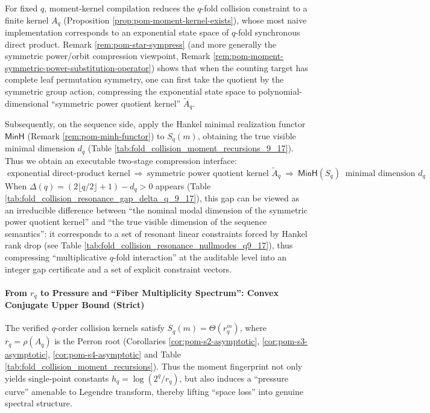 \begin{remark}\label{rem:pom-sympower-then-minh}
For fixed \(q\), moment-kernel compilation reduces the \(q\)-fold collision constraint to a finite kernel \(A_q\) (Proposition \ref{prop:pom-moment-kernel-exists}), whose most naive implementation corresponds to an exponential state space of \(q\)-fold synchronous direct product.
Remark \ref{rem:pom-star-sympress} (and more generally the symmetric power/orbit compression viewpoint, Remark \ref{rem:pom-moment-symmetric-power-substitution-operator}) shows that when the counting target has complete leaf permutation symmetry, one can first take the quotient by the symmetric group action, compressing the exponential state space to polynomial-dimensional ``symmetric power quotient kernel'' \(\widetilde A_q\).
\par
Subsequently, on the sequence side, apply the Hankel minimal realization functor \(\mathsf{MinH}\) (Remark \ref{rem:pom-minh-functor}) to \(S_q(m)\), obtaining the true visible minimal dimension \(d_q\) (Table \ref{tab:fold_collision_moment_recursions_9_17}).
Thus we obtain an executable two-stage compression interface:
\[
\boxed{\;
\text{exponential direct-product kernel}\ \Longrightarrow\ \text{symmetric power quotient kernel }\widetilde A_q\ \Longrightarrow\ \mathsf{MinH}(S_q)\ \text{ minimal dimension }d_q\; }.
\]
When \(\Delta(q)=(2\lfloor q/2\rfloor+1)-d_q>0\) appears (Table \ref{tab:fold_collision_resonance_gap_delta_q_9_17}),
this gap can be viewed as an irreducible difference between ``the nominal modal dimension of the symmetric power quotient kernel'' and ``the true visible dimension of the sequence semantics'':
it corresponds to a set of resonant linear constraints forced by Hankel rank drop (see Table \ref{tab:fold_collision_resonance_nullmodes_q9_17}), thus compressing ``multiplicative \(q\)-fold interaction'' at the auditable level into an integer gap certificate and a set of explicit constraint vectors.
\end{remark}

\paragraph{From \texorpdfstring{$r_q$}{r\_q} to Pressure and ``Fiber Multiplicity Spectrum'': Convex Conjugate Upper Bound (Strict)}
The verified \(q\)-order collision kernels satisfy \(S_q(m)=\Theta(r_q^m)\), where \(r_q=\rho(A_q)\) is the Perron root (Corollaries \ref{cor:pom-s2-asymptotic}, \ref{cor:pom-s3-asymptotic}, \ref{cor:pom-s4-asymptotic} and Table \ref{tab:fold_collision_moment_recursions}).
Thus the moment fingerprint not only yields single-point constants \(h_q=\log(2^q/r_q)\), but also induces a ``pressure curve'' amenable to Legendre transform, thereby lifting ``space loss'' into genuine spectral structure.

